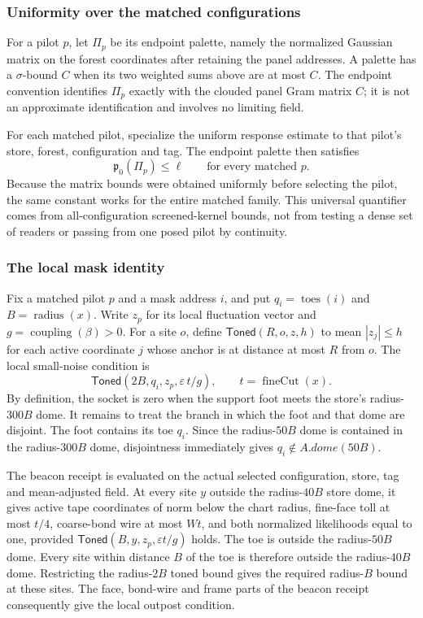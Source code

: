 \subsubsection{Uniformity over the matched configurations}

For a pilot $p$, let $\Pi_p$ be its endpoint palette, namely the normalized
Gaussian matrix on the forest coordinates after retaining the panel
addresses. A palette has a $\sigma$-bound $C$ when its two weighted sums
above are at most $C$. The endpoint convention identifies $\Pi_p$ exactly
with the clouded panel Gram matrix $C$; it is not an approximate
identification and involves no limiting field.

For each matched pilot, specialize the uniform response estimate to that
pilot's store, forest, configuration and tag. The endpoint palette then
satisfies
\[
  \mathfrak p_0(\Pi_p)\leq\ell\qquad\text{for every matched }p.
\]
Because the matrix bounds were obtained uniformly before selecting the
pilot, the same constant works for the entire matched family. This
universal quantifier comes from all-configuration screened-kernel bounds,
not from testing a dense set of readers or passing from one posed pilot by
continuity.

\subsubsection{The local mask identity}

Fix a matched pilot $p$ and a mask address $i$, and put
$q_i=\operatorname{toes}(i)$ and $B=\operatorname{radius}(x)$. Write
$z_p$ for its local fluctuation vector and $g=\operatorname{coupling}(\beta)>0$.
For a site $o$, define $\mathsf{Toned}(R,o,z,h)$ to mean
$|z_j|\leq h$ for each active coordinate $j$ whose anchor is at distance
at most $R$ from $o$. The local small-noise condition is
\[
 \mathsf{Toned}(2B,q_i,z_p,\varepsilon\,t/g),
 \qquad t=\operatorname{fineCut}(x).
\]
By definition, the
socket is zero when the support foot meets the store's radius-$300B$ dome.
It remains to treat the branch in which the foot and that dome are
disjoint. The foot contains its toe $q_i$. Since the radius-$50B$ dome is contained
in the radius-$300B$ dome, disjointness immediately gives
$q_i\notin A.dome(50B)$.

The beacon receipt is evaluated on the actual selected configuration,
store, tag and mean-adjusted field. At every site $y$ outside the
radius-$40B$ store dome, it gives active tape coordinates of norm below
the chart radius, fine-face toll at most $t/4$, coarse-bond wire at most
$Wt$, and both normalized likelihoods equal to one, provided
$\mathsf{Toned}(B,y,z_p,\varepsilon t/g)$ holds.
The toe is outside the radius-$50B$ dome. Every site within distance $B$ of
the toe is therefore outside the radius-$40B$ dome. Restricting the
radius-$2B$ toned bound gives the required radius-$B$ bound at these sites.
The face, bond-wire and frame parts of the beacon receipt consequently
give the local outpost condition.

